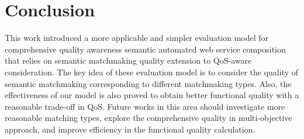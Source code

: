 \documentclass{llncs}
\begin{document}
\section{Conclusion}\label{conclusion}
This work introduced a more applicable and simpler evaluation model for comprehensive quality awareness semantic automated web service composition that relies on semantic matchmaking quality extension to QoS-aware consideration. The key idea of these evaluation model is to consider the quality of semantic matchmaking corresponding to different matchmaking types. Also, the effectiveness of our model is also proved to obtain better functional quality with a reasonable trade-off in QoS. Future works in this area should investigate more reasonable matching types, explore the comprehensive quality in multi-objective approach, and improve efficiency in the functional quality calculation.


\end{document}
